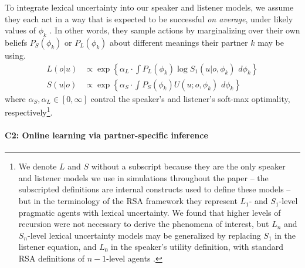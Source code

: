To integrate lexical uncertainty into our speaker and listener models, we assume they each act in a way that is expected to be successful \emph{on average}, under likely values of $\phi_k$ \cite{SmithGoodmanFrank13_RecursivePragmaticReasoningNIPS}.
In other words, they sample actions by marginalizing over their own beliefs $P_S(\phi_k)$ or $P_L(\phi_k)$ about different meanings their partner $k$ may be using.
\begin{align}
L(o|u) &\propto   \exp\left\{\alpha_L\cdot \textstyle{\int} P_L(\phi_k)  \log S_1(u|o, \phi_k)\,\,d\phi_k\right\}\nonumber\\
S(u|o) &\propto  \exp\left\{\alpha_S \cdot \textstyle{\int} P_S(\phi_k)  U(u; o, \phi_k) \,\,d\phi_k\right\}\label{eq:marginalized}
\end{align}
where $\alpha_S, \alpha_L \in[0,\infty]$ control the speaker's and listener's soft-max optimality, respectively\footnote{We denote $L$ and $S$ without a subscript because they are the only speaker and listener models we use in simulations throughout the paper -- the subscripted definitions are internal constructs used to define these models -- but in the terminology of the RSA framework they represent $L_1$- and $S_1$-level pragmatic agents with lexical uncertainty. We found that higher levels of recursion were not  necessary to derive the phenomena of interest, but $L_n$ and $S_n$-level lexical uncertainty models may be generalized by replacing $S_1$ in the listener equation, and $L_0$ in the speaker's utility definition, with standard RSA definitions of $n-1$-level agents \cite<see also>{zaslavsky2020rate}.}.

\paragraph{C2: Online learning via partner-specific inference}

